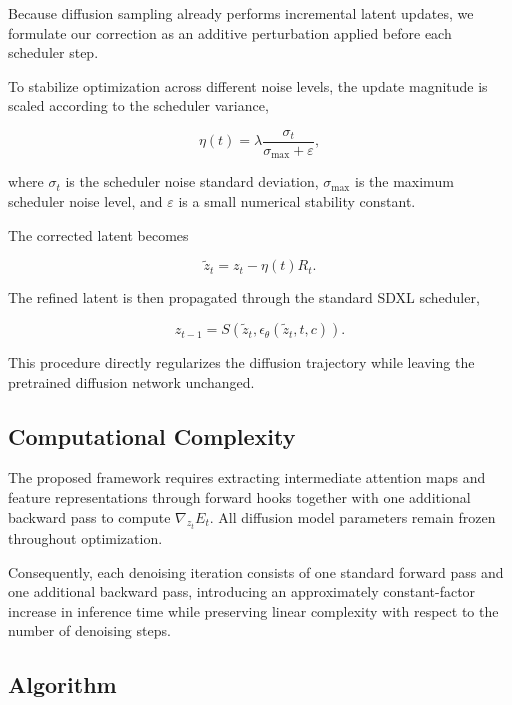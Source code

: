 \documentclass[12pt]{article}
\begin{document}
Because diffusion sampling already performs incremental latent updates, we formulate our correction as an additive perturbation applied before each scheduler step.

To stabilize optimization across different noise levels, the update magnitude is scaled according to the scheduler variance,

\begin{equation}
\eta(t) = \lambda \frac{\sigma_t}{\sigma_{\max} + \varepsilon},
\tag{11}
\end{equation}

where $\sigma_t$ is the scheduler noise standard deviation, $\sigma_{\max}$ is the maximum scheduler noise level, and $\varepsilon$ is a small numerical stability constant.

The corrected latent becomes

\begin{equation}
\tilde{z}_t = z_t - \eta(t) R_t.
\tag{12}
\end{equation}

The refined latent is then propagated through the standard SDXL scheduler,

\begin{equation}
z_{t-1} = S\left(\tilde{z}_t, \epsilon_\theta(\tilde{z}_t, t, c)\right).
\tag{13}
\end{equation}

This procedure directly regularizes the diffusion trajectory while leaving the pretrained diffusion network unchanged.

\subsection{Computational Complexity}

The proposed framework requires extracting intermediate attention maps and feature representations through forward hooks together with one additional backward pass to compute $\nabla_{z_t} E_t$. All diffusion model parameters remain frozen throughout optimization.

Consequently, each denoising iteration consists of one standard forward pass and one additional backward pass, introducing an approximately constant-factor increase in inference time while preserving linear complexity with respect to the number of denoising steps.

\subsection{Algorithm}
\end{document}
